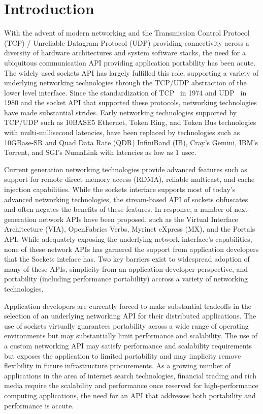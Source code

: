 \section{Introduction}


With the advent of modern networking and the Transmission Control
Protocol (TCP) / Unreliable Datagram Protocol (UDP) providing
connectivity across a diversity of hardware architectures and system
software stacks, the need for a ubiquitous communication API providing
application portability has been acute. The widely used sockets API
has largely fulfilled this role, supporting a variety of underlying
networking technologies through the TCP/UDP abstraction of the lower
level interface. Since the standardization of TCP~\cite{tcp-standard}
in 1974 and UDP~\cite{udp-standard} in 1980 and the socket API that
supported these protocols, networking technologies have made
substantial strides. Early networking technologies supported by
TCP/UDP such as 10BASE5 Ethernet, Token Ring, and Token Bus
technologies with multi-millisecond latencies, have been replaced by
technologies such as 10GBase-SR and Quad Data Rate (QDR) InfiniBand
(IB), Cray's Gemini, IBM's Torrent, and SGI's NumaLink  with latencies
as low as 1 usec. 

Current generation networking technologies provide advanced features
such as support for remote direct memory access (RDMA), reliable
multicast, and cache injection capabilities. While the sockets
interface supports most of today's advanced networking technologies,
the stream-based API of sockets obfuscates and often negates the
benefits of these features. In response, a number of next-generation
network APIs have been proposed, such as the Virtual Interface
Architecture (VIA), OpenFabrics Verbs, Myrinet eXpress (MX), and the
Portals API. While adequately exposing the underlying network
interface's capabilities, none of these network APIs has garnered the
support from application developers that the Sockets inteface
has. Two key barriers exist to widespread adoption of many of these
APIs, simplicity from an application developer perspective, and
portability (including performance portability) accross a variety of
networking technologies. 

Application developers are currently forced to make substantial
tradeoffs in the selection of an underlying networking API for their
distributed applications. The use of sockets virtually guarantees
portability across a wide range of operating environments but may
substantially limit performance and scalability. The use of a custom
networking API may satisfy performance and scalability requirements
but exposes the application to limited portability and may implicity
remove flexibility in future infrastructure procurements. As a growing
number of applications in the area of internet search technologies,
financial trading and rich media require the scalability and
performance once reserved for high-performance computing applications,
the need for an API that addresses both portability and performance is
accute. 

